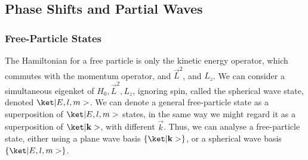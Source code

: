 \subsection{Phase Shifts and Partial Waves}


\subsubsection{Free-Particle States}
The Hamiltonian for a free particle is only the kinetic energy operator, which commutes with the momentum operator, and $\vec{L}^2$, and $L_z$. We can consider a simultaneous eigenket of $H_0, \vec{L}^2, L_z$, ignoring spin, called the spherical wave state, denoted $\k{E,l,m}$. We can denote a general free-particle state as a superposition of $\k{E,l,m}$ states, in the same way we might regard it as a superposition of $\k{\vec{k}}$, with different $\vec{k}$. Thus, we can analyse a free-particle state, either using a plane wave basis $\{\k{\vec{k}}\}$, or a spherical wave basis $\{\k{E,l,m}\}$.

